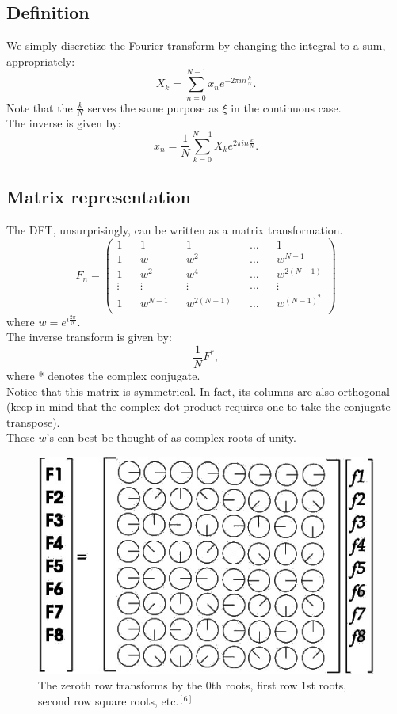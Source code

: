 \documentclass[11pt]{article}
\begin{document}
\subsection{Definition}
We simply discretize the Fourier transform by changing the integral to a sum, appropriately:
$$X_k=\sum_{n=0}^{N-1}x_n e^{-2\pi i n \frac{k}{N}}.$$
Note that the $\frac{k}{N}$ serves the same purpose as $\xi$ in the continuous case.\\
The inverse is given by:
$$ x_n = \frac{1}{N}\sum_{k=0}^{N-1}X_k e^{2\pi i n \frac{k}{N}}.$$
\subsection{Matrix representation}
The DFT, unsurprisingly, can be written as a matrix transformation.
$$
 F_n=\begin{pmatrix}
  1 && 1 && 1 && \dots && 1 \\
  1 && w && w^2 && \dots && w^{N-1}\\
  1 && w^2 && w^4 && \dots && w^{2(N-1)}\\
  \vdots && \vdots && \vdots && \dots &&\vdots \\
  1 && w^{N-1} && w^{2(N-1)} && \dots && w^{(N-1)^2} \\
 \end{pmatrix}$$
where $w=e^{i \frac{2\pi}{N}}$.\\
The inverse transform is given by:
$$ \frac{1}{N}F^*,$$ where * denotes the complex conjugate.\\
Notice that this matrix is symmetrical. In fact, its columns are also orthogonal (keep in mind that the complex dot product requires one to take the conjugate transpose).\\
These $w$'s can best be thought of as complex roots of unity.\\
\begin{figure}[h]
    \centering
    \includegraphics[scale=.45]{DFT_vis.jpg}
    \caption{The zeroth row transforms by the 0th roots, first row 1st roots, second row square roots, etc$.^{[6]}$}
\end{figure}
\end{document}
